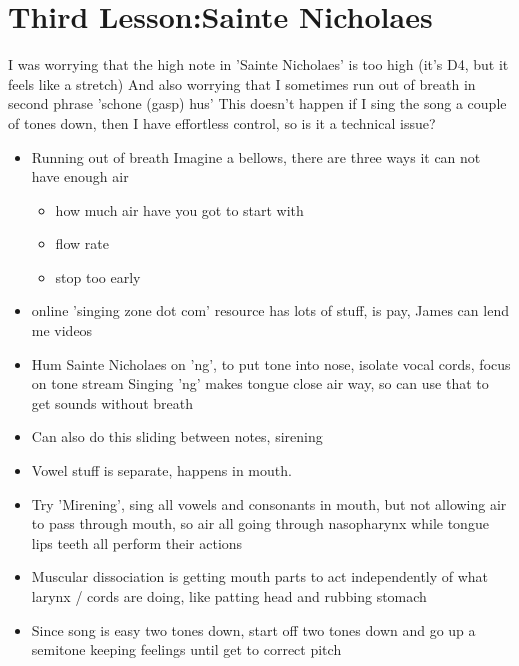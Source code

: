 \documentclass[14pt,a4paper]{memoir}
\begin{document}
\section*{Third Lesson:Sainte Nicholaes}

I was worrying that the high note in 'Sainte Nicholaes' is too high (it's D4, but it feels like a stretch)
And also worrying that I sometimes run out of breath in second phrase 'schone (gasp) hus'
This doesn't happen if I sing the song a couple of tones down, then I have effortless control, so is it a technical issue?


\begin{itemize}
\item Running out of breath
  Imagine a bellows, there are three ways it can not have enough air
  \begin{itemize}
  \item how much air have you got to start with
  \item flow rate
  \item stop too early
  \end{itemize}

  \item online 'singing zone dot com' resource has lots of stuff, is pay, James can lend me videos

  \item Hum Sainte Nicholaes on 'ng', to put tone into nose, isolate vocal cords, focus on tone stream
    Singing 'ng' makes tongue close air way, so can use that to get sounds without breath

  \item Can also do this sliding between notes, sirening

  \item Vowel stuff is separate, happens in mouth.

  \item Try 'Mirening', sing all vowels and consonants in mouth, but not allowing air to pass through mouth, so air all going through nasopharynx
  while tongue lips teeth all perform their actions


  \item Muscular dissociation is getting mouth parts to act independently of what larynx / cords are doing, like patting head and rubbing stomach

  \item Since song is easy two tones down, start off two tones down and go up a semitone keeping feelings until get to correct pitch


\end{itemize}
\end{document}
